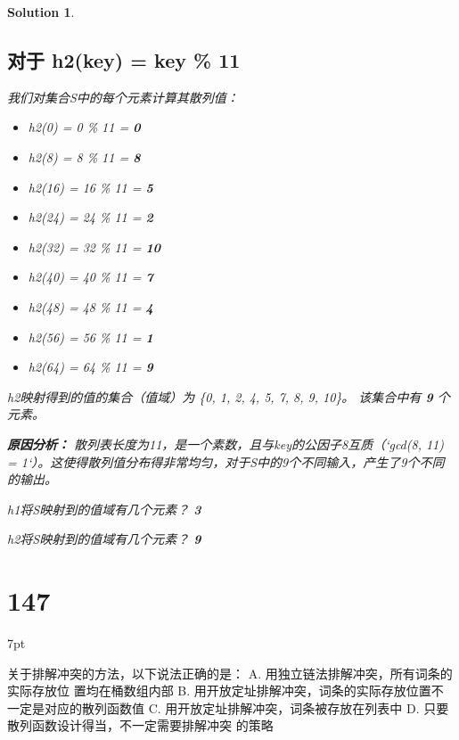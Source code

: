 \documentclass[UTF8]{report}
\newtheorem{solution}{Solution}
\theoremstyle{MyLineTheoremStyle} %
\theoremstyle{MyBlockTheoremStyle} %
\theoremstyle{MySubsubsectionStyle} %
\newenvironment{graybox}{%
        \def\FrameCommand{%
        \hspace{1pt}%
        {\color{gray}\small \vrule width 2pt}%
        {\color{graybox_color}\vrule width 4pt}%
        \colorbox{graybox_color}%
        }%
        \MakeFramed{\advance\hsize-\width\FrameRestore}%
        \noindent\hspace{-4.55pt}%
        \begin{adjustwidth}{}{7pt}%
        \vspace{2pt}\vspace{2pt}%
        }
        {%
        \vspace{2pt}\end{adjustwidth}\endMakeFramed%
        }
\begin{document}
\begin{solution}
\subsection*{对于 h2(key) = key \% 11}
我们对集合S中的每个元素计算其散列值：
\begin{itemize}
    \item h2(0) = 0 \% 11 = \textbf{0}
    \item h2(8) = 8 \% 11 = \textbf{8}
    \item h2(16) = 16 \% 11 = \textbf{5}
    \item h2(24) = 24 \% 11 = \textbf{2}
    \item h2(32) = 32 \% 11 = \textbf{10}
    \item h2(40) = 40 \% 11 = \textbf{7}
    \item h2(48) = 48 \% 11 = \textbf{4}
    \item h2(56) = 56 \% 11 = \textbf{1}
    \item h2(64) = 64 \% 11 = \textbf{9}
\end{itemize}
h2映射得到的值的集合（值域）为 \{0, 1, 2, 4, 5, 7, 8, 9, 10\}。
该集合中有 \textbf{9} 个元素。

\textbf{原因分析：} 散列表长度为11，是一个素数，且与key的公因子8互质（`gcd(8, 11) = 1`）。这使得散列值分布得非常均匀，对于S中的9个不同输入，产生了9个不同的输出。

\hrulefill

h1将S映射到的值域有几个元素？ \textbf{3}

h2将S映射到的值域有几个元素？ \textbf{9}
\end{solution}

\section*{147}
\begin{graybox}
关于排解冲突的方法，以下说法正确的是：
A. 用独立链法排解冲突，所有词条的实际存放位
置均在桶数组内部
B. 用开放定址排解冲突，词条的实际存放位置不
一定是对应的散列函数值
C. 用开放定址排解冲突，词条被存放在列表中
D. 只要散列函数设计得当，不一定需要排解冲突
的策略
\end{graybox}
\end{document}

